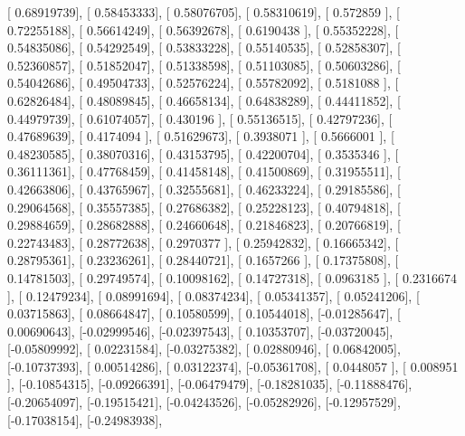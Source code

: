 \documentclass{article}
\begin{document}
       [ 0.68919739],
       [ 0.58453333],
       [ 0.58076705],
       [ 0.58310619],
       [ 0.572859  ],
       [ 0.72255188],
       [ 0.56614249],
       [ 0.56392678],
       [ 0.6190438 ],
       [ 0.55352228],
       [ 0.54835086],
       [ 0.54292549],
       [ 0.53833228],
       [ 0.55140535],
       [ 0.52858307],
       [ 0.52360857],
       [ 0.51852047],
       [ 0.51338598],
       [ 0.51103085],
       [ 0.50603286],
       [ 0.54042686],
       [ 0.49504733],
       [ 0.52576224],
       [ 0.55782092],
       [ 0.5181088 ],
       [ 0.62826484],
       [ 0.48089845],
       [ 0.46658134],
       [ 0.64838289],
       [ 0.44411852],
       [ 0.44979739],
       [ 0.61074057],
       [ 0.430196  ],
       [ 0.55136515],
       [ 0.42797236],
       [ 0.47689639],
       [ 0.4174094 ],
       [ 0.51629673],
       [ 0.3938071 ],
       [ 0.5666001 ],
       [ 0.48230585],
       [ 0.38070316],
       [ 0.43153795],
       [ 0.42200704],
       [ 0.3535346 ],
       [ 0.36111361],
       [ 0.47768459],
       [ 0.41458148],
       [ 0.41500869],
       [ 0.31955511],
       [ 0.42663806],
       [ 0.43765967],
       [ 0.32555681],
       [ 0.46233224],
       [ 0.29185586],
       [ 0.29064568],
       [ 0.35557385],
       [ 0.27686382],
       [ 0.25228123],
       [ 0.40794818],
       [ 0.29884659],
       [ 0.28682888],
       [ 0.24660648],
       [ 0.21846823],
       [ 0.20766819],
       [ 0.22743483],
       [ 0.28772638],
       [ 0.2970377 ],
       [ 0.25942832],
       [ 0.16665342],
       [ 0.28795361],
       [ 0.23236261],
       [ 0.28440721],
       [ 0.1657266 ],
       [ 0.17375808],
       [ 0.14781503],
       [ 0.29749574],
       [ 0.10098162],
       [ 0.14727318],
       [ 0.0963185 ],
       [ 0.2316674 ],
       [ 0.12479234],
       [ 0.08991694],
       [ 0.08374234],
       [ 0.05341357],
       [ 0.05241206],
       [ 0.03715863],
       [ 0.08664847],
       [ 0.10580599],
       [ 0.10544018],
       [-0.01285647],
       [ 0.00690643],
       [-0.02999546],
       [-0.02397543],
       [ 0.10353707],
       [-0.03720045],
       [-0.05809992],
       [ 0.02231584],
       [-0.03275382],
       [ 0.02880946],
       [ 0.06842005],
       [-0.10737393],
       [ 0.00514286],
       [ 0.03122374],
       [-0.05361708],
       [ 0.0448057 ],
       [ 0.008951  ],
       [-0.10854315],
       [-0.09266391],
       [-0.06479479],
       [-0.18281035],
       [-0.11888476],
       [-0.20654097],
       [-0.19515421],
       [-0.04243526],
       [-0.05282926],
       [-0.12957529],
       [-0.17038154],
       [-0.24983938],
\end{document}
